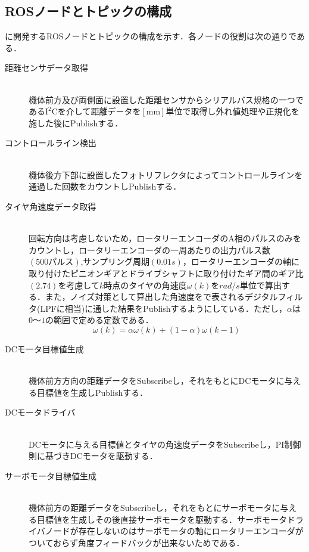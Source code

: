 \newpage
\subsection{ROSノードとトピックの構成}
に開発するROSノードとトピックの構成を示す．各ノードの役割は次の通りである．
\begin{description}

    \item[距離センサデータ取得] \mbox{} \\
      機体前方及び両側面に設置した距離センサからシリアルバス規格の一つである$\mathrm{I^2C}$を介して距離データを$\mathrm{[mm]}$単位で取得し外れ値処理や正規化を施した後にPublishする．
    \item[コントロールライン検出] \mbox{} \\
      機体後方下部に設置したフォトリフレクタによってコントロールラインを通過した回数をカウントしPublishする．

    \item[タイヤ角速度データ取得] \mbox{} \\
      回転方向は考慮しないため，ロータリーエンコーダのA相のパルスのみをカウントし，ロータリーエンコーダの一周あたりの出力パルス数$(500パルス)$,サンプリング周期$(0.01\unit{s})$，ロータリーエンコーダの軸に取り付けたピニオンギアとドライブシャフトに取り付けたギア間のギア比$(2.74)$を考慮して$k$時点のタイヤの角速度$\omega(k)$を$\unit{rad/s}$単位で算出する．また，ノイズ対策として算出した角速度をで表されるデジタルフィルタ(LPFに相当)に通した結果をPublishするようにしている．ただし，$\alpha$は$0〜1$の範囲で定める定数である．\\
      \begin{equation}
      	\omega(k)=\alpha\omega(k)+(1-\alpha)\omega(k-1)\label{eq::lpf}
      \end{equation}

    \item[DCモータ目標値生成] \mbox{} \\
      機体前方方向の距離データをSubscribeし，それをもとにDCモータに与える目標値を生成しPublishする．

    \item[DCモータドライバ] \mbox{} \\
      DCモータに与える目標値とタイヤの角速度データをSubscribeし，PI制御則に基づきDCモータを駆動する．

    \item[サーボモータ目標値生成] \mbox{} \\
      機体前方の距離データをSubscribeし，それをもとにサーボモータに与える目標値を生成しその後直接サーボモータを駆動する．サーボモータドライバノードが存在しないのはサーボモータの軸にロータリーエンコーダがついておらず角度フィードバックが出来ないためである．

  \end{description}
